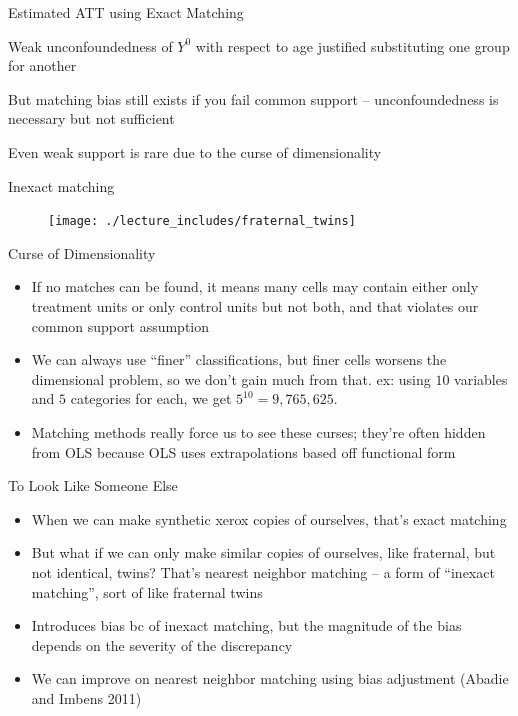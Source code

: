 \documentclass{beamer}
\begin{document}
\begin{frame}{Estimated ATT using Exact Matching}


Weak unconfoundedness of $Y^0$ with respect to age justified substituting one group for another

\bigskip

But matching bias still exists if you fail common support -- unconfoundedness is necessary but not sufficient

\bigskip

Even weak support is rare due to the curse of dimensionality

\end{frame}





\begin{frame}{Inexact matching}

\begin{figure}[!t]\centering
\texttt{[image: ./lecture\_includes/fraternal\_twins]}
\end{figure}

\end{frame}


\begin{frame}{Curse of Dimensionality}
	
	\begin{itemize}
	\item If no matches can be found, it means many cells may contain either only treatment units or only control units but not both, and that violates our common support assumption
	\item We can always use ``finer'' classifications, but finer cells worsens the dimensional problem, so we don't gain  much from that.  ex: using $10$ variables and $5$ categories for each, we get $5^{10} = 9,765,625$.  
	\item Matching methods really force us to see these curses; they're often hidden from OLS because OLS uses extrapolations based off functional form
	\end{itemize}
\end{frame}	





\begin{frame}{To Look Like Someone Else}

\begin{itemize}
\item When we can make synthetic xerox copies of ourselves, that's exact matching
\item But what if we can only make similar copies of ourselves, like fraternal, but not identical, twins? That's nearest neighbor matching -- a form of ``inexact matching'', sort of like fraternal twins
\item Introduces bias bc of inexact matching, but the magnitude of the bias depends on the severity of the discrepancy
\item We can improve on nearest neighbor matching using bias adjustment (Abadie and Imbens 2011) 
\end{itemize}

\end{frame}
\end{document}
